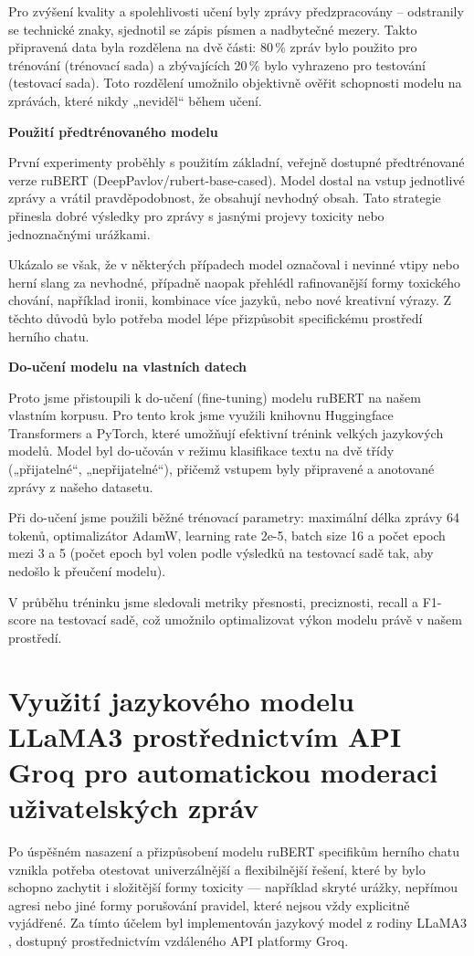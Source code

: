 \documentclass[FM,Proj]{tulthesis}
\begin{document}
Pro zvýšení kvality a spolehlivosti učení byly zprávy předzpracovány – odstranily se technické znaky, sjednotil se zápis písmen a nadbytečné mezery. Takto připravená data byla rozdělena na dvě části: 80\,\% zpráv bylo použito pro trénování (trénovací sada) a zbývajících 20\,\% bylo vyhrazeno pro testování (testovací sada). Toto rozdělení umožnilo objektivně ověřit schopnosti modelu na zprávách, které nikdy „neviděl“ během učení.

\textbf{Použití předtrénovaného modelu}

První experimenty proběhly s použitím základní, veřejně dostupné předtrénované verze ruBERT (DeepPavlov/rubert-base-cased). Model dostal na vstup jednotlivé zprávy a vrátil pravděpodobnost, že obsahují nevhodný obsah. Tato strategie přinesla dobré výsledky pro zprávy s jasnými projevy toxicity nebo jednoznačnými urážkami.

Ukázalo se však, že v některých případech model označoval i nevinné vtipy nebo herní slang za nevhodné, případně naopak přehlédl rafinovanější formy toxického chování, například ironii, kombinace více jazyků, nebo nové kreativní výrazy. Z těchto důvodů bylo potřeba model lépe přizpůsobit specifickému prostředí herního chatu.

\textbf{Do-učení modelu na vlastních datech}

Proto jsme přistoupili k do-učení (fine-tuning) modelu ruBERT na našem vlastním korpusu. Pro tento krok jsme využili knihovnu Huggingface Transformers a PyTorch, které umožňují efektivní trénink velkých jazykových modelů. Model byl do-učován v režimu klasifikace textu na dvě třídy („přijatelné“, „nepřijatelné“), přičemž vstupem byly připravené a anotované zprávy z našeho datasetu.

Při do-učení jsme použili běžné trénovací parametry: maximální délka zprávy 64 tokenů, optimalizátor AdamW, learning rate 2e-5, batch size 16 a počet epoch mezi 3 a 5 (počet epoch byl volen podle výsledků na testovací sadě tak, aby nedošlo k přeučení modelu).

V průběhu tréninku jsme sledovali metriky přesnosti, preciznosti, recall a F1-score na testovací sadě, což umožnilo optimalizovat výkon modelu právě v našem prostředí.

\section{ Využití jazykového modelu LLaMA3 prostřednictvím API Groq pro automatickou moderaci uživatelských zpráv
}\label{deklarace}
Po úspěšném nasazení a přizpůsobení modelu ruBERT specifikům herního chatu vznikla potřeba otestovat univerzálnější a flexibilnější řešení, které by bylo schopno zachytit i složitější formy toxicity — například skryté urážky, nepřímou agresi nebo jiné formy porušování pravidel, které nejsou vždy explicitně vyjádřené. Za tímto účelem byl implementován jazykový model z rodiny LLaMA3 \cite{grattafiori2024llama3herdmodels}, dostupný prostřednictvím vzdáleného API platformy Groq.
\end{document}
